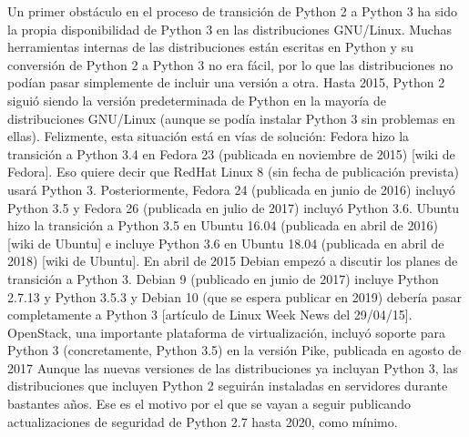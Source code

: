 Un primer obstáculo en el proceso de transición de Python 2 a Python 3 ha sido la propia disponibilidad de Python 3 en las distribuciones GNU/Linux. Muchas herramientas internas de las distribuciones están escritas en Python y su conversión de Python 2 a Python 3 no era fácil, por lo que las distribuciones no podían pasar simplemente de incluir una versión a otra.
Hasta 2015, Python 2 siguió siendo la versión predeterminada de Python en la mayoría de distribuciones GNU/Linux (aunque se podía instalar Python 3 sin problemas en ellas). Felizmente, esta situación está en vías de solución:
Fedora hizo la transición a Python 3.4 en Fedora 23 (publicada en noviembre de 2015) [wiki de Fedora]. Eso quiere decir que RedHat Linux 8 (sin fecha de publicación prevista) usará Python 3. Posteriormente, Fedora 24 (publicada en junio de 2016) incluyó Python 3.5 y Fedora 26 (publicada en julio de 2017) incluyó Python 3.6.
Ubuntu hizo la transición a Python 3.5 en Ubuntu 16.04 (publicada en abril de 2016) [wiki de Ubuntu] e incluye Python 3.6 en Ubuntu 18.04 (publicada en abril de 2018) [wiki de Ubuntu].
En abril de 2015 Debian empezó a discutir los planes de transición a Python 3. Debian 9 (publicado en junio de 2017) incluye Python 2.7.13 y Python 3.5.3 y Debian 10 (que se espera publicar en 2019) debería pasar completamente a Python 3 [artículo de Linux Week News del 29/04/15].
OpenStack, una importante plataforma de virtualización, incluyó soporte para Python 3 (concretamente, Python 3.5) en la versión Pike, publicada en agosto de 2017
Aunque las nuevas versiones de las distribuciones ya incluyan Python 3, las distribuciones que incluyen Python 2 seguirán instaladas en servidores durante bastantes años. Ese es el motivo por el que se vayan a seguir publicando actualizaciones de seguridad de Python 2.7 hasta 2020, como mínimo.

